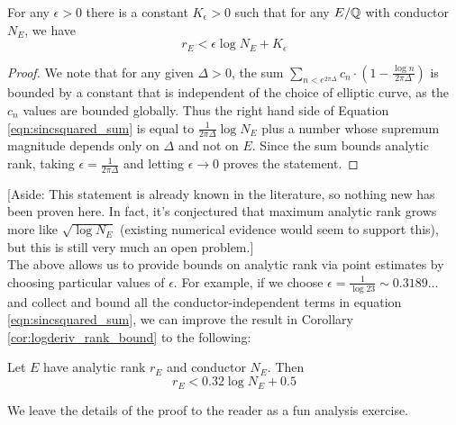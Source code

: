 \begin{corollary}[GRH]\label{cor:rank_slower_than_log_N}
For any $\epsilon >0$ there is a constant $K_{\epsilon}>0$ such that for any $E/\mathbb{Q}$ with conductor $N_E$, we have
\begin{equation}
r_E < \epsilon \log N_E + K_{\epsilon}
\end{equation}
\end{corollary}
\begin{proof}
We note that for any given $\Delta>0$, the sum $ \sum_{n<e^{2\pi \Delta}} c_n \cdot \left(1-\frac{\log n}{2\pi \Delta}\right)$ is bounded by a constant that is independent of the choice of elliptic curve, as the $c_n$ values are bounded globally. Thus the right hand side of Equation \ref{eqn:sincsquared_sum} is equal to $\frac{1}{2\pi \Delta}\log N_E$ plus a number whose supremum magnitude depends only on $\Delta$ and not on $E$. Since the sum bounds analytic rank, taking $\epsilon = \frac{1}{2\pi \Delta}$ and letting $\epsilon \to 0$ proves the statement.
\end{proof}

[Aside: This statement is already known in the literature, so nothing new has been proven here. In fact, it's conjectured that maximum analytic rank grows more like $\sqrt{\log N_E}$ (existing numerical evidence would seem to support this), but this is still very much an open problem.] \\

The above allows us to provide bounds on analytic rank via point estimates by choosing particular values of $\epsilon$. For example, if we choose $\epsilon = \frac{1}{\log 23} \sim 0.3189\ldots$ and collect and bound all the conductor-independent terms in equation \ref{eqn:sincsquared_sum}, we can improve the result in Corollary \ref{cor:logderiv_rank_bound} to the following:
\begin{corollary}[GRH]\label{cor:better_an_bound}
Let $E$ have analytic rank $r_E$ and conductor $N_E$. Then
\begin{equation}
r_E < 0.32 \log N_E + 0.5
\end{equation}
\end{corollary}
We leave the details of the proof to the reader as a fun analysis exercise.\\

